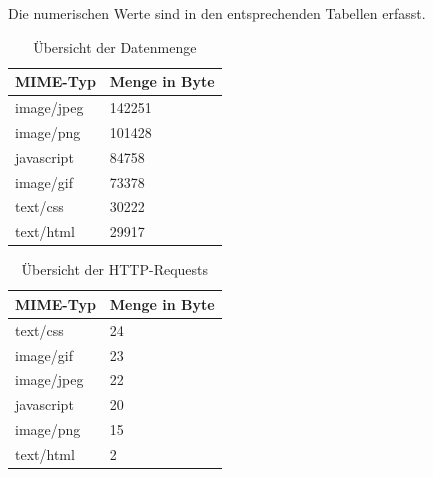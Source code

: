 Die numerischen Werte sind in den entsprechenden Tabellen erfasst.
\begin{table}[!ht]
\centering
\caption{\"Ubersicht der Datenmenge}
    \begin{tabular}{ | p{3cm} | p{1.5cm} | }
    \hline
    MIME-Typ &	Menge in Byte	\\ \hline
    image/jpeg	&142251\\ \hline
    image/png	&101428\\ \hline
    javascript	&84758\\ \hline
    image/gif	&73378\\ \hline
    text/css	&30222\\ \hline
    text/html	&29917\\ \hline
    \hline
    \end{tabular}
\end{table}
\begin{table}[!ht]
\centering
\caption{\"Ubersicht der HTTP-Requests}
    \begin{tabular}{ | p{3cm} | p{1.5cm} | }
    \hline
    MIME-Typ &	Menge in Byte	\\ \hline
    text/css	 &	24 	\\ \hline
image/gif	&	23 	\\ \hline
image/jpeg	&	22 	\\ \hline
javascript	&	20 	\\  \hline
image/png	&	15 	\\ \hline
text/html	&	2 	\\ \hline
    \hline
    \end{tabular}
\end{table}

